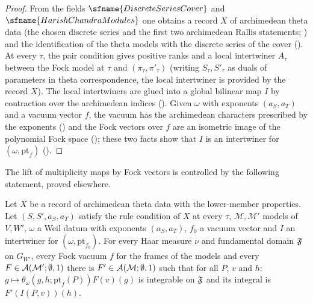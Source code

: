 \begin{proof}
From the fields $\sfname{DiscreteSeriesCover}$ and $\sfname{HarishChandraModules}$ one obtains a record $X$ of archimedean theta data
(the chosen discrete series and the first two archimedean Rallis statements; )
and the identification of the theta models with the discrete series of the cover
(). At every $\tau$, the pair condition gives positive ranks and a local
intertwiner $A_\tau$ between the Fock model at $\tau$ and $(\pi_\tau,\pi'_\tau)$ (writing $S_\tau,S'_\tau$ as duals of parameters in theta correspondence, the local intertwiner is provided by the record $X$). The
local intertwiners are glued into a global bilinear map $I$ by contraction over the archimedean indices
(). Given $\omega$ with exponents $(a_S,a_T)$ and a vacuum
vector $f$, the vacuum has the archimedean characters prescribed by the exponents
() and the Fock vectors over $f$ are an isometric image of the polynomial
Fock space (); these two facts show that $I$ is an intertwiner
for $(\omega,\mathrm{pt}_f)$ ().
\end{proof}

The lift of multiplicity maps by Fock vectors is controlled by the following statement, proved elsewhere.

\begin{lemma}\label{pf:fs:pairLifts}
Let $X$ be a record of archimedean theta data with the lower-member properties. Let $(S,S',a_S,a_T)$ satisfy the rule condition of
$X$ at every $\tau$, $\mathcal M,\mathcal M'$ models of $V,W'$, $\omega$ a Weil datum with exponents $(a_S,a_T)$, $f_0$ a vacuum vector
and $I$ an intertwiner for $(\omega,\mathrm{pt}_{f_0})$. For every Haar measure $\nu$ and fundamental domain $\mathfrak F$ on $G_{W'}$, every
Fock vacuum $f$ for the frames of the models and every $F\in\mathcal A(\mathcal M';\emptyset,1)$ there is $F'\in\mathcal A(\mathcal M;\emptyset,1)$
such that for all $P$, $v$ and $h$: $g\mapsto\theta_\omega(g,h;\mathrm{pt}_f(P))F(v)(g)$ is integrable on $\mathfrak F$ and its integral is
$F'(I(P,v))(h)$.
\end{lemma}

